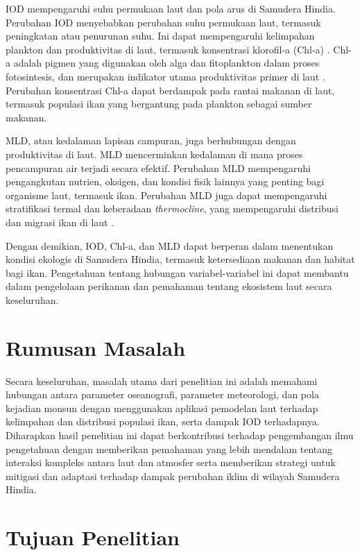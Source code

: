 \begin{spacing}{1.5}
	IOD mempengaruhi suhu permukaan laut dan pola arus di Samudera Hindia. Perubahan IOD menyebabkan perubahan suhu permukaan laut, termasuk peningkatan atau penurunan suhu. Ini dapat mempengaruhi kelimpahan plankton dan produktivitas di laut, termasuk konsentrasi klorofil-a (Chl-a) \cite{brewin2012influence}. Chl-a adalah pigmen yang digunakan oleh alga dan fitoplankton dalam proses fotosintesis, dan merupakan indikator utama produktivitas primer di laut \cite{huot2007does}. Perubahan konsentrasi Chl-a dapat berdampak pada rantai makanan di laut, termasuk populasi ikan yang bergantung pada plankton sebagai sumber makanan.
	
	MLD, atau kedalaman lapisan campuran, juga berhubungan dengan produktivitas di laut. MLD mencerminkan kedalaman di mana proses pencampuran air terjadi secara efektif. Perubahan MLD mempengaruhi pengangkutan nutrien, oksigen, dan kondisi fisik lainnya yang penting bagi organisme laut, termasuk ikan. Perubahan MLD juga dapat mempengaruhi stratifikasi termal dan keberadaan \textit{thermocline}, yang mempengaruhi distribusi dan migrasi ikan di laut \cite{bernal2017sharing}.
	
	Dengan demikian, IOD, Chl-a, dan MLD dapat berperan dalam menentukan kondisi ekologis di Samudera Hindia, termasuk ketersediaan makanan dan habitat bagi ikan. Pengetahuan tentang hubungan variabel-variabel ini dapat membantu dalam pengelolaan perikanan dan pemahaman tentang ekosistem laut secara keseluruhan.
	
	\section[Rumusan Masalah]{Rumusan Masalah}
	Secara keseluruhan, masalah utama dari penelitian ini adalah memahami hubungan antara parameter oseanografi, parameter meteorologi, dan pola kejadian monsun dengan menggunakan aplikasi pemodelan laut terhadap kelimpahan dan distribusi populasi ikan, serta dampak IOD terhadapnya. Diharapkan hasil penelitian ini dapat berkontribusi terhadap pengembangan ilmu pengetahuan dengan memberikan pemahaman yang lebih mendalam tentang interaksi kompleks antara laut dan atmosfer serta memberikan strategi untuk mitigasi dan adaptasi terhadap dampak perubahan iklim di wilayah Samudera Hindia.

	\section[Tujuan Penelitian]{Tujuan Penelitian}
	

\end{spacing}
